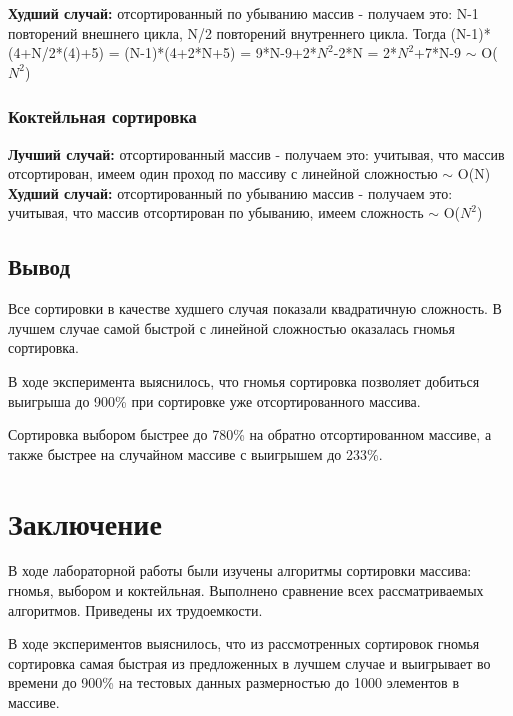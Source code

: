 \documentclass[a4paper,12pt]{report}
\begin{document}
        	\textbf{Худший случай:} отсортированный по убыванию массив - получаем это: N-1 повторений внешнего цикла, N/2 повторений внутреннего цикла. Тогда (N-1)*(4+N/2*(4)+5) = (N-1)*(4+2*N+5) = 9*N-9+2*$N^{2}$-2*N = 2*$N^{2}$+7*N-9 $\sim$ O($N^{2}$)

	\subsection{Коктейльная сортировка}

        	\textbf{Лучший случай:} отсортированный массив - получаем это: учитывая, что массив отсортирован, имеем один проход по массиву с линейной сложностью $\sim$ O(N) \cite{Virt_cocktail}\\
        	
        	\textbf{Худший случай:} отсортированный по убыванию массив - получаем это: учитывая, что массив отсортирован по убыванию, имеем сложность $\sim$ O($N^{2}$) \cite{Virt_cocktail}

	\section{Вывод}

			Все сортировки в качестве худшего случая показали квадратичную сложность. 
			В лучшем случае самой быстрой с линейной сложностью оказалась гномья сортировка.
			
			В ходе эксперимента выяснилось, что гномья сортировка позволяет добиться выигрыша до 900\% при сортировке уже отсортированного массива.
			
			Сортировка выбором быстрее до 780\% на обратно отсортированном массиве, а также быстрее на случайном массиве с выигрышем до 233\%.

    \newpage

    \chapter*{Заключение}
        \label{sec:conclusion_part}
        
			В ходе лабораторной работы были изучены алгоритмы сортировки массива: гномья, выбором и коктейльная. 
			Выполнено сравнение всех рассматриваемых алгоритмов. 
			Приведены их трудоемкости. 
			
			В ходе экспериментов выяснилось, что из рассмотренных сортировок гномья сортировка самая быстрая из предложенных в лучшем случае и выигрывает во времени до 900\% на тестовых данных размерностью до 1000 элементов в массиве.
			
\end{document}
